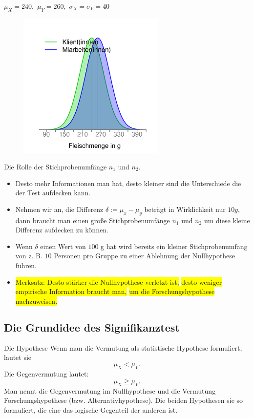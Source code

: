 \documentclass[usenames,dvipsnames,handout]{beamer}
\begin{document}
\begin{frame}{$\mu_{X}=240,$ $\mu_{Y}=260,$ $\sigma_{X}=\sigma_{Y}=40$}
  \begin{figure}[ht]
 	\centering
 	      \includegraphics[width=0.65\textwidth]{nearlyfair.pdf}
 	\end{figure}
\end{frame}

\begin{frame}{Die Rolle der Stichprobenumfänge $n_{1}$ und $n_{2}.$}
\begin{itemize}
\item{Desto mehr Informationen man hat, desto kleiner sind die Unterschiede die der Test aufdecken kann.}\pause
\item{Nehmen wir an, die Differenz $\delta := \mu_{x}-\mu_{y}$ beträgt in Wirklichkeit nur $10g,$ dann braucht man
einen große Stichprobenumfänge $n_{1}$ und $n_{2}$ um diese kleine Differenz aufdecken zu können.}\pause
\item{Wenn $\delta$ einen Wert von $100$ g hat wird bereits ein kleiner Stichprobenumfang von z. B. $10$
Personen pro Gruppe zu einer Ablehnung der Nullhypothese führen.}\pause
\item{\colorbox{yellow}{Merksatz: Desto stärker die Nullhypothese verletzt ist,} 
\colorbox{yellow}{desto weniger empirische Information braucht man,}
\colorbox{yellow}{um die Forschungshypothese nachzuweisen.}}
\end{itemize}
\end{frame}
\subsection{Die Grundidee des Signifikanztest}
\begin{frame}{Die Hypothese}
Wenn man die Vermutung als statistische Hypothese formuliert, lautet sie
$$
\mu_{X} < \mu_{Y}.
$$
Die Gegenvermutung lautet:
$$
\mu_{X} \geq \mu_{Y}.
$$
Man nennt die Gegenvermutung im  Nullhypothese und die Vermutung Forschungshypothese (bzw. Alternativhypothese).
Die beiden Hypothesen sie so formuliert, die eine das logische Gegenteil der anderen ist.

\end{frame}
\end{document}
